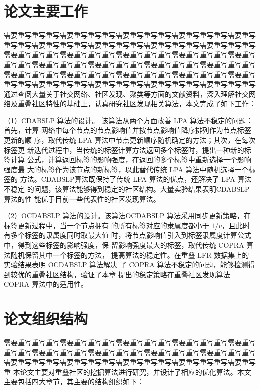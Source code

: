 \section{论文主要工作}
需要重写重写重写需要重写重写重写需要重写重写重写需要重写重写重写需要重写重写重写需要重写重写重写需要重写重写重写需要重写重写重写需要重写重写重写需要重写重写重写需要重写重写重写需要重写重写重写需要重写重写重写需要重写重写重写需要重写重写重写需要重写重写重写需要重写重写重写需要重写重写重写需要重写重写重写需要重写重写重写需要重写重写重写需要重写重写重写需要重写重写重写需要重写重写重写需要重写重写重写需要重写重写重写需要重写重写重写
通过查阅大量关于社交网络、社区发现、聚类等方面的文献资料，深入理解社交网络及重叠社区特性的基础上，认真研究社区发现相关算法，本文完成了如下工作：

（1）CDABSLP 算法的设计。
该算法从两个方面改善 LPA 算法不稳定的问题：首先，计算
网络中每个节点的节点影响值并按节点影响值降序排列作为节点标签更新的顺
序，取代传统 LPA 算法中节点更新顺序随机确定的方法；其次，在每次标签更
新迭代过程中，当传统的标签计算方法返回多个标签时，提出一种新的标签计算
公式，计算返回标签的影响强度，在返回的多个标签中重新选择一个影响强度最
大的标签作为该节点的新标签，以此替代传统 LPA 算法中随机选择一个标签的
方法。CDABSLP算法既保持了传统 LPA 算法的优点，还解决了 LPA 算法不稳定
的问题，该算法能够得到稳定的社区结构。大量实验结果表明CDABSLP算法的性
能优于目前一些代表性的社区发现算法。 

（2）OCDABSLP 算法的设计。该算法OCDABSLP 算法采用同步更新策略，在标签更新过程中，当一个节点拥有
的所有标签对应的隶属度都小于 $1/v$，且此时有多个标签的隶属度同时取最大值
时，将节点影响值引入到标签隶属度计算公式中，得到这些标签的影响强度，保
留影响强度最大的标签，取代传统 COPRA 算法随机保留其中一个标签的方法，
提高算法的稳定性。在重叠 LFR 数据集上的实验结果表明 OCDABSLP 算法解决
了 COPRA 算法不稳定的问题，能够检测得到较优的重叠社区结构，验证了本章
提出的稳定策略在重叠社区发现算法 COPRA 算法中的适用性。



\section{论文组织结构}
需要重写重写重写需要重写重写重写需要重写重写重写需要重写重写重写需要重写重写重写需要重写重写重写需要重写重写重写需要重写重写重写需要重写重写重写需要重写重写重写需要重写重写重写需要重写重写重写需要重写重写重写需要重写重
本论文主要对重叠社区的挖掘算法进行研究，并设计了相应的优化算法。本文主要包括四大章节，其主要的结构组织如下：

